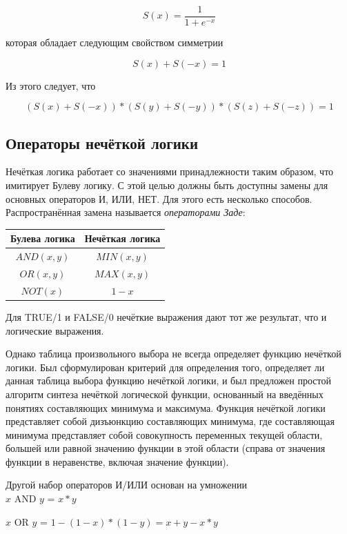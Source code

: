 \documentclass[a4paper,12pt]{report}
\begin{document}
\[S(x) = \frac{1}{1 + e^{-x}}\]

которая обладает следующим свойством симметрии

\[S(x) + S(-x) = 1\]

Из этого следует, что

\[(S(x)+S(-x))*(S(y)+S(-y))*(S(z)+S(-z)) = 1\]

\subsection{Операторы нечёткой логики}
Нечёткая логика работает со значениями принадлежности таким образом, что имитирует Булеву логику. С этой целью должны быть доступны замены для основных операторов И, ИЛИ, НЕТ. Для этого есть несколько способов. Распространённая замена называется \textit{операторами Заде}:

\begin{center}
	\begin{tabular}{ |c|c| }
		\hline
		\textbf{Булева логика} & \textbf{Нечёткая логика}  \\
		\hline
		\(AND(x, y)\) & \(MIN(x, y)\)  \\
		\hline
		\(OR(x, y)\) & \(MAX(x, y)\)  \\
		\hline
		\(NOT(x)\) & \(1 - x\)  \\
		\hline
	\end{tabular}
\end{center}

Для TRUE/1 и FALSE/0 нечёткие выражения дают тот же результат, что и логические выражения.

Однако таблица произвольного выбора не всегда определяет функцию нечёткой логики. Был сформулирован критерий для определения того, определяет ли данная таблица выбора функцию нечёткой логики, и был предложен простой алгоритм синтеза нечёткой логической функции, основанный на введённых понятиях составляющих минимума и максимума. Функция нечёткой логики представляет собой дизъюнкцию составляющих минимума, где составляющая минимума представляет собой совокупность переменных текущей области, большей или равной значению функции в этой области (справа от значения функции в неравенстве, включая значение функции).

Другой набор операторов И/ИЛИ основан на умножении\\

\(x\) AND \(y\) = \(x*y\)

\(x\) OR \(y\) = \(1-(1-x)*(1-y) = x+y-x*y\)\\
	
\end{document}
